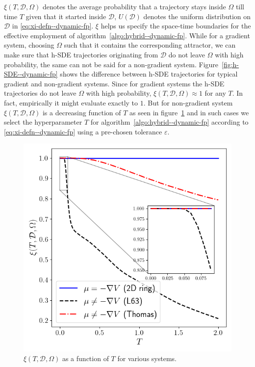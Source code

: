 $\xi(T, \mathcal D, \Omega)$ denotes the average probability that a trajectory stays inside $\Omega$ till time $T$ given that it started inside $\mathcal D$, $U(\mathcal D)$ denotes the uniform distribution on $\mathcal D$ in \eqref{eq:xi-defn--dynamic-fp}. $\xi$ helps us specify the space-time boundaries for the effective employment of algorithm~\ref{algo:hybrid--dynamic-fp}. While for a gradient system, choosing $\Omega$ such that it contains the corresponding attractor, we can make sure that h-SDE trajectories originating from $\mathcal D$ do not leave $\Omega$ with high probability, the same can not be said for a non-gradient system. Figure~\ref{fig:h-SDE--dynamic-fp} shows the difference between h-SDE trajectories for typical gradient and non-gradient systems. Since for gradient systems the h-SDE trajectories do not leave $\Omega$ with high probability, $\xi(T, \mathcal D, \Omega)\approx 1$ for any $T$. In fact, empirically it might evaluate exactly to $1$. But for non-gradient system $\xi(T, \mathcal D, \Omega)$ is a decreasing function of $T$ as seen in figure~\ref{fig:xi--dynamic-fp} and in such cases we select the hyperparameter $T$ for algorithm~\ref{algo:hybrid--dynamic-fp} according to \eqref{eq:xi-defn--dynamic-fp} using a pre-chosen tolerance $\varepsilon$.

\begin{figure}[!ht]
    \centering
\includegraphics[scale=0.5]{dynamic-fp/plots/xi.png}
    \caption{$\xi(T, \mathcal D, \Omega)$ as a function of $T$ for various systems.}
    \label{fig:xi--dynamic-fp}
\end{figure}


